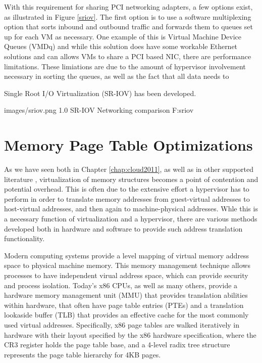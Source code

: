 	With this requirement for sharing PCI networking adapters, a few options exist, as illustrated in Figure \ref{sriov}. The first option is to use a software multiplexing option that sorts inbound and outbound traffic and forwards them to queues set up for each VM as necessary.  One example of this is Virtual Machine Device Queues (VMDq) and while this solution does have some workable Ethernet solutions and can allows VMs to share a PCI based NIC, there are performance limitations. These limiations are due to the amount of hypervisor involvement necessary in sorting the queues, as well as the fact that all data needs to  

 Single Root I/O Virtualization (SR-IOV) has been developed. 



  {images/sriov.png}
  {1.0}
  {SR-IOV Networking comparison}
  {F:sriov}

 


 

\section{Memory Page Table Optimizations}

As we have seen both in Chapter \ref{chap:cloud2011}, as well as in other supported literature \cite{MagellanFinal}, virtualization of memory structures becomes a point of contention and potential overhead. This is often due to the extensive effort a hypervisor has to perform in order to translate memory addresses from guest-virtual addresses to host-virtual addresses, and then again to machine-physical addresses.  Whle this is a necessary function of virtualization and a hypervisor, there are various methods developed both in hardware and software to provide such address translation functionality. 

Modern computing systems provide a level mapping of virtual memory address space to physical machine memory. This memory management technique allows processes to have independent virual address space, which can provide security and process isolation.  Today's x86 CPUs, as well as many others, provide a hardware memory management unit (MMU) that provides translation abilities within hardware, that often have page table entries (PTEs) and a translation lookaside buffer (TLB) that provides an effective cache for the most commonly used virtual addresses.  Specifically, x86 page tables are walked iteratively in hardware with their layout specified by the x86 hardware specification, where the CR3 register holds the page table base, and a 4-level radix tree structure represents the page table hierarchy for 4KB pages.  

